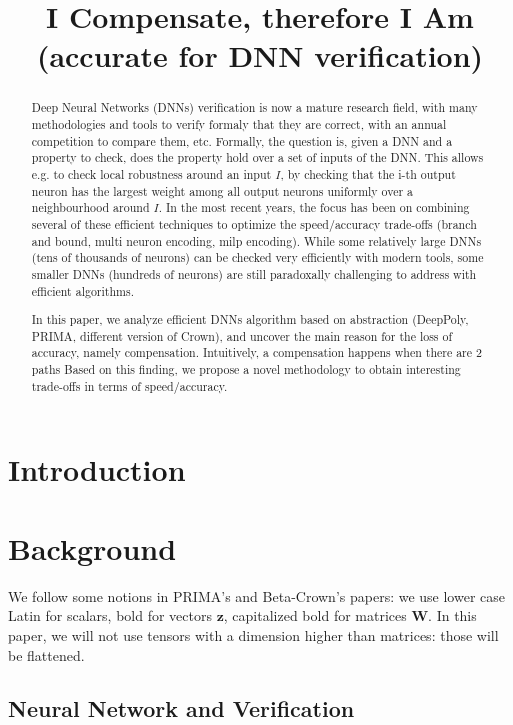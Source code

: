 \documentclass{llncs}
\title{I Compensate, therefore I Am \\ (accurate for DNN verification)}
\date{}
\begin{document}
\maketitle

\begin{abstract}
  Deep Neural Networks (DNNs) verification is now a mature research field, with many methodologies and tools to verify formaly  that they are correct, with an annual competition to compare them, etc. Formally, the question is, given a DNN and a property to check, does the property hold over a set of inputs of the DNN. This allows e.g. to check local robustness around an input $I$, by checking that the i-th output neuron has the largest weight among all output neurons uniformly over a neighbourhood around $I$.
  In the most recent years, the focus has been on combining several of these efficient techniques to optimize the speed/accuracy trade-offs (branch and bound, multi neuron encoding, milp encoding). While some relatively large DNNs (tens of thousands of neurons) can be checked very efficiently with modern tools, 
  some smaller DNNs (hundreds of neurons) are still paradoxally challenging to address with efficient algorithms.

  In this paper, we analyze efficient DNNs algorithm based on abstraction (DeepPoly, PRIMA, different version of Crown), and uncover the main reason for the loss of accuracy, namely compensation. Intuitively, a compensation happens when there are 2 paths 
   Based on this finding, we propose a novel methodology to obtain interesting trade-offs in terms of speed/accuracy.
\end{abstract}	


\section{Introduction}

\section{Background}

We follow some notions in PRIMA's and Beta-Crown's papers: we use lower case Latin for scalars, bold for vectors
$\boldsymbol{z}$, capitalized bold for matrices $\boldsymbol{W}$. In this paper, we will not use tensors with a dimension higher than matrices: those will be flattened.




\subsection{Neural Network and Verification}
\end{document}
